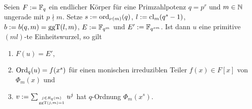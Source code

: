 \begin{satz}
  \label{satz:konstruktion_q_ordnung_reg}
  Seien $F := \mathbb{F}_q$ ein endlicher Körper für eine Primzahlpotenz $q = p^r$ 
  und $m\in\mathbb{N}$ ungerade mit $p\nmid m$.
  Setze $s := \operatorname{ord}_{\nu(m)}(q)$, 
  $l := \operatorname{cl}_m(q^s-1)$, $b:= b(q,m) = \operatorname{ggT}(l,m)$, $E := \mathbb{F}_{q^m}$ und
  $E' := \mathbb{F}_{q^{sm}}$. Ist dann
  $u$ eine primitive $(ml)$-te Einheitswurzel, so gilt
  \begin{enumerate}
    \item $F(u) = E'$,
    \item $\operatorname{Ord}_q(u) = f(x^s)$ für einen monischen irreduziblen Teiler 
      $f(x) \in F[x]$ von $\Phi_m(x)$ und 
    \item $v := \sum_{j \in R_q(m)\atop \operatorname{ggT}(j,m)=1} 
      u^j$ hat $q$-Ordnung $\Phi_m(x^s)$.
  \end{enumerate}
\end{satz}

